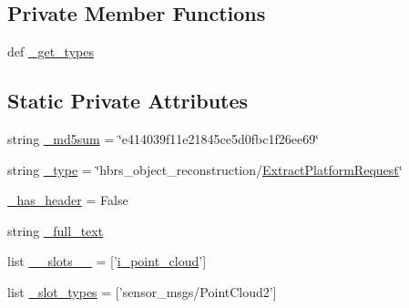 \subsection*{\-Private \-Member \-Functions}
\begin{DoxyCompactItemize}
\item 
def \hyperlink{classhbrs__object__reconstruction_1_1srv_1_1___extract_platform_1_1_extract_platform_request_a18e6f74b37f314cdc4c386260ae08d6a}{\-\_\-get\-\_\-types}
\end{DoxyCompactItemize}
\subsection*{\-Static \-Private \-Attributes}
\begin{DoxyCompactItemize}
\item 
string \hyperlink{classhbrs__object__reconstruction_1_1srv_1_1___extract_platform_1_1_extract_platform_request_a38ea50488cff902cf9458dce67ab24df}{\-\_\-md5sum} = \char`\"{}e414039f11e21845ce5d0fbc1f26ee69\char`\"{}
\item 
string \hyperlink{classhbrs__object__reconstruction_1_1srv_1_1___extract_platform_1_1_extract_platform_request_a1bf12a51e8cb92292f0f58c4a3ccfde2}{\-\_\-type} = \char`\"{}hbrs\-\_\-object\-\_\-reconstruction/\hyperlink{classhbrs__object__reconstruction_1_1srv_1_1___extract_platform_1_1_extract_platform_request}{\-Extract\-Platform\-Request}\char`\"{}
\item 
\hyperlink{classhbrs__object__reconstruction_1_1srv_1_1___extract_platform_1_1_extract_platform_request_a53871fd1b530aa56bb3d6552bbdb469b}{\-\_\-has\-\_\-header} = \-False
\item 
string \hyperlink{classhbrs__object__reconstruction_1_1srv_1_1___extract_platform_1_1_extract_platform_request_ac49a349768f8a306b2d2613fc55a8ac1}{\-\_\-full\-\_\-text}
\item 
list \hyperlink{classhbrs__object__reconstruction_1_1srv_1_1___extract_platform_1_1_extract_platform_request_ad07c4a9d1e27749fbdab98c94fe151bc}{\-\_\-\-\_\-slots\-\_\-\-\_\-} = \mbox{[}'\hyperlink{classhbrs__object__reconstruction_1_1srv_1_1___extract_platform_1_1_extract_platform_request_ac465a0550257d3068eb4c26887648ea2}{i\-\_\-point\-\_\-cloud}'\mbox{]}
\item 
list \hyperlink{classhbrs__object__reconstruction_1_1srv_1_1___extract_platform_1_1_extract_platform_request_a414ab110a7bdbbfa5dd529a13903d433}{\-\_\-slot\-\_\-types} = \mbox{[}'sensor\-\_\-msgs/\-Point\-Cloud2'\mbox{]}
\end{DoxyCompactItemize}


